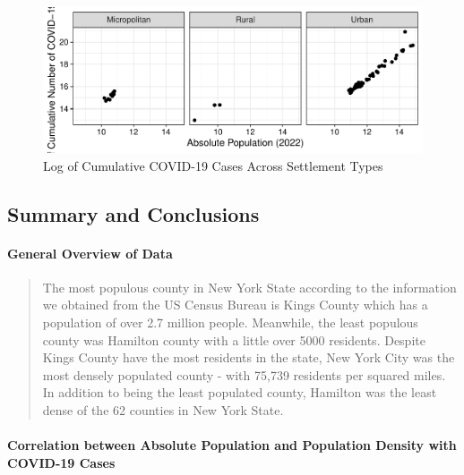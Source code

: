 \documentclass[
  12pt,
]{article}
\begin{document}
\begin{figure}

\includegraphics{EDA_Final_Group_Project_files/figure-latex/unnamed-chunk-30-1} \hfill{}

\caption{Log of Cumulative COVID-19 Cases Across Settlement Types}\label{fig:unnamed-chunk-30}
\end{figure}

\newpage

\hypertarget{summary-and-conclusions}{%
\subsection{Summary and Conclusions}\label{summary-and-conclusions}}

\hypertarget{general-overview-of-data}{%
\paragraph{General Overview of Data}\label{general-overview-of-data}}

\begin{quote}
The most populous county in New York State according to the information
we obtained from the US Census Bureau is Kings County which has a
population of over 2.7 million people. Meanwhile, the least populous
county was Hamilton county with a little over 5000 residents. Despite
Kings County have the most residents in the state, New York City was the
most densely populated county - with 75,739 residents per squared miles.
In addition to being the least populated county, Hamilton was the least
dense of the 62 counties in New York State.
\end{quote}

\hypertarget{correlation-between-absolute-population-and-population-density-with-covid-19-cases}{%
\paragraph{Correlation between Absolute Population and Population
Density with COVID-19
Cases}\label{correlation-between-absolute-population-and-population-density-with-covid-19-cases}}
\end{document}
